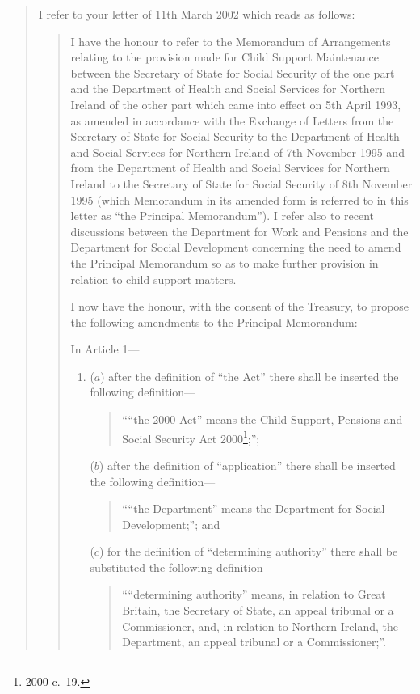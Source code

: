 \documentclass[12pt,a4paper]{article}
\begin{document}
\begin{quotation}
I refer to your letter of 11th March 2002 which reads as follows:
\begin{quotation}
I have the honour to refer to the Memorandum of Arrangements relating to the provision made for Child Support Maintenance between the Secretary of State for Social Security of the one part and the Department of Health and Social Services for Northern Ireland of the other part which came into effect on 5th April 1993, as amended in accordance with the Exchange of Letters from the Secretary of State for Social Security to the Department of Health and Social Services for Northern Ireland of 7th November 1995 and from the Department of Health and Social Services for Northern Ireland to the Secretary of State for Social Security of 8th November 1995 (which Memorandum in its amended form is referred to in this letter as “the Principal Memorandum”). I refer also to recent discussions between the Department for Work and Pensions and the Department for Social Development concerning the need to amend the Principal Memorandum so as to make further provision in relation to child support matters.

I now have the honour, with the consent of the Treasury, to propose the following amendments to the Principal Memorandum:

In Article 1—
\begin{enumerate}\item[]
($a$) after the definition of “the Act” there shall be inserted the following definition—
\begin{quotation}
““the 2000 Act” means the Child Support, Pensions and Social Security Act 2000\footnote{2000 c.\ 19.};”;
\end{quotation}

($b$) after the definition of “application” there shall be inserted the following definition—
\begin{quotation}
““the Department” means the Department for Social Development;”; and
\end{quotation}

($c$) for the definition of “determining authority” there shall be substituted the following definition—
\begin{quotation}
    ““determining authority” means, in relation to Great Britain, the Secretary of State, an appeal tribunal or a Commissioner, and, in relation to Northern Ireland, the Department, an appeal tribunal or a Commissioner;”. 
\end{quotation}
\end{enumerate}


\end{quotation}
\end{quotation}
\end{document}
